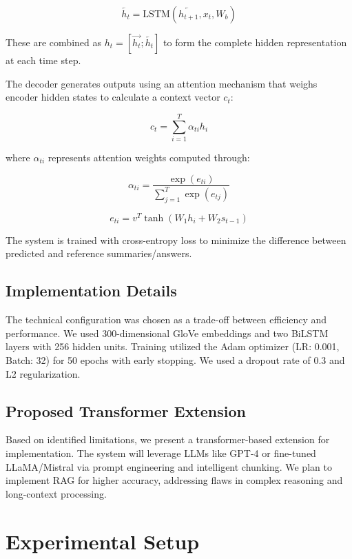 \documentclass[conference]{IEEEtran}
\begin{document}
\begin{equation}
\overleftarrow{h_t} = \text{LSTM}(\overleftarrow{h_{t+1}}, x_t, W_b)
\end{equation}

These are combined as $h_t = [\overrightarrow{h_t}; \overleftarrow{h_t}]$ to form the complete hidden representation at each time step. 

The decoder generates outputs using an attention mechanism that weighs encoder hidden states to calculate a context vector $c_t$:

\begin{equation}
c_t = \sum_{i=1}^{T} \alpha_{ti} h_i
\end{equation}

where $\alpha_{ti}$ represents attention weights computed through:

\begin{equation}
\alpha_{ti} = \frac{\exp(e_{ti})}{\sum_{j=1}^{T} \exp(e_{tj})}
\end{equation}

\begin{equation}
e_{ti} = v^T \tanh(W_1 h_i + W_2 s_{t-1})
\end{equation}

The system is trained with cross-entropy loss to minimize the difference between predicted and reference summaries/answers.

\subsection{Implementation Details}
The technical configuration was chosen as a trade-off between efficiency and performance. We used 300-dimensional GloVe embeddings and two BiLSTM layers with 256 hidden units. Training utilized the Adam optimizer (LR: 0.001, Batch: 32) for 50 epochs with early stopping. We used a dropout rate of 0.3 and L2 regularization.

\subsection{Proposed Transformer Extension}
Based on identified limitations, we present a transformer-based extension for implementation. The system will leverage LLMs like GPT-4 or fine-tuned LLaMA/Mistral via prompt engineering and intelligent chunking. We plan to implement RAG for higher accuracy, addressing flaws in complex reasoning and long-context processing.

\section{Experimental Setup}
\end{document}
